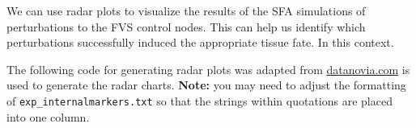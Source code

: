 \documentclass[
]{book}
\newenvironment{Shaded}{\begin{snugshade}}{\end{snugshade}}
\newcommand{\CommentTok}[1]{\textcolor[rgb]{0.56,0.35,0.01}{\textit{#1}}}
\newcommand{\ControlFlowTok}[1]{\textcolor[rgb]{0.13,0.29,0.53}{\textbf{#1}}}
\newcommand{\DataTypeTok}[1]{\textcolor[rgb]{0.13,0.29,0.53}{#1}}
\newcommand{\DecValTok}[1]{\textcolor[rgb]{0.00,0.00,0.81}{#1}}
\newcommand{\FloatTok}[1]{\textcolor[rgb]{0.00,0.00,0.81}{#1}}
\newcommand{\KeywordTok}[1]{\textcolor[rgb]{0.13,0.29,0.53}{\textbf{#1}}}
\newcommand{\NormalTok}[1]{#1}
\newcommand{\OperatorTok}[1]{\textcolor[rgb]{0.81,0.36,0.00}{\textbf{#1}}}
\newcommand{\OtherTok}[1]{\textcolor[rgb]{0.56,0.35,0.01}{#1}}
\newcommand{\StringTok}[1]{\textcolor[rgb]{0.31,0.60,0.02}{#1}}
\begin{document}
We can use radar plots to visualize the results of the SFA simulations of perturbations to the FVS control nodes. This can help us identify which perturbations successfully induced the appropriate tissue fate. In this context.

The following code for generating radar plots was adapted from \href{https://www.google.com/search?q=create+_beautiful_+radar+chart\&oq=create+beautiful+rada\&aqs=chrome.1.69i57j0i10i22i30.11973j0j1\&sourceid=chrome\&ie=UTF-8}{datanovia.com} is used to generate the radar charts.
\textbf{Note: } you may need to adjust the formatting of \texttt{exp\_internalmarkers.txt} so that the strings within quotations are placed into one column.

\begin{Shaded}
\end{Shaded}
\end{document}

